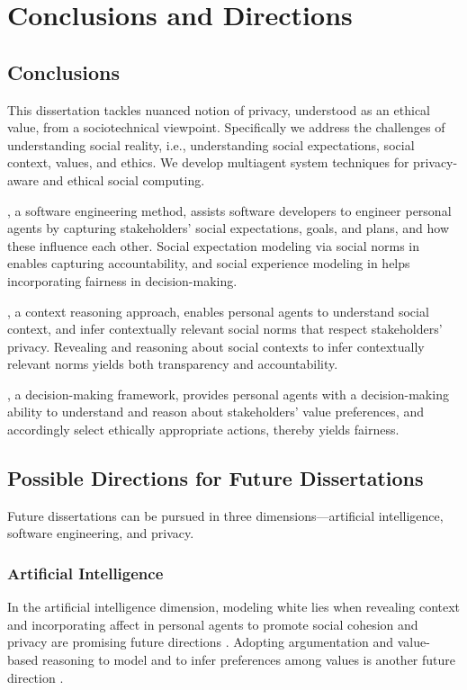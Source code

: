 \chapter{Conclusions and Directions}
\label{chap:conclusions}

\section{Conclusions}

This dissertation tackles nuanced notion of privacy, understood as an ethical value, from a sociotechnical viewpoint. 
Specifically we address the challenges of understanding social reality, i.e., understanding social expectations, social context, values, and ethics.
We develop multiagent system techniques for privacy-aware and ethical social computing.  

\frameworkA, a software engineering method, assists software developers to engineer personal agents by capturing stakeholders' social expectations, goals, and plans, and how these influence each other.  
Social expectation modeling via social norms in \frameworkA enables capturing accountability,
and social experience modeling in \frameworkA helps incorporating fairness in decision-making.

\frameworkB, a context reasoning approach, enables personal agents to understand social context, and infer contextually relevant social norms that respect stakeholders' privacy. 
Revealing and reasoning about social contexts to infer contextually relevant norms yields both transparency and accountability.

\frameworkAinur, a decision-making framework, provides personal agents with a decision-making ability to understand and reason about stakeholders' value preferences, 
and accordingly select ethically appropriate actions, thereby yields fairness.  

\section{Possible Directions for Future Dissertations}
Future dissertations can be pursued in three dimensions---artificial intelligence, software engineering, and privacy.

\subsection{Artificial Intelligence}
In the artificial intelligence dimension, modeling white lies when revealing context and incorporating affect in personal agents to promote social cohesion and privacy are promising future directions \citep{IJCAI-18:Poros,Kalia+14:Emotions}.
Adopting argumentation and value-based reasoning to model and to infer preferences among values is another future direction \citep{Ajmeri-IJCAI16-Coco,Ajmeri-Computer17-Aragorn}.

